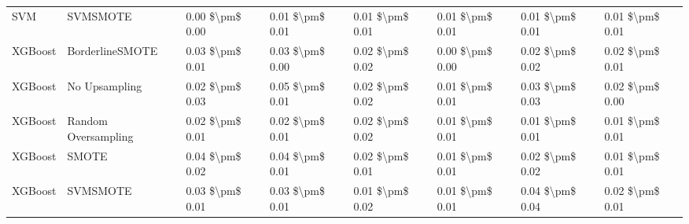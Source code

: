 \begin{tabular}{llllllll}
                            SVM &                      SVMSMOTE & 0.00 \$\textbackslash pm\$ 0.00 &           0.01 \$\textbackslash pm\$ 0.01 &       0.01 \$\textbackslash pm\$ 0.01 &        0.01 \$\textbackslash pm\$ 0.01 &                         0.01 \$\textbackslash pm\$ 0.01 & 0.01 \$\textbackslash pm\$ 0.01 \\
                        XGBoost &               BorderlineSMOTE & 0.03 \$\textbackslash pm\$ 0.01 &           0.03 \$\textbackslash pm\$ 0.00 &       0.02 \$\textbackslash pm\$ 0.02 &        0.00 \$\textbackslash pm\$ 0.00 &                         0.02 \$\textbackslash pm\$ 0.02 & 0.02 \$\textbackslash pm\$ 0.01 \\
                        XGBoost &                 No Upsampling & 0.02 \$\textbackslash pm\$ 0.03 &           0.05 \$\textbackslash pm\$ 0.01 &       0.02 \$\textbackslash pm\$ 0.02 &        0.01 \$\textbackslash pm\$ 0.01 &                         0.03 \$\textbackslash pm\$ 0.03 & 0.02 \$\textbackslash pm\$ 0.00 \\
                        XGBoost &           Random Oversampling & 0.02 \$\textbackslash pm\$ 0.01 &           0.02 \$\textbackslash pm\$ 0.01 &       0.02 \$\textbackslash pm\$ 0.02 &        0.01 \$\textbackslash pm\$ 0.01 &                         0.01 \$\textbackslash pm\$ 0.01 & 0.01 \$\textbackslash pm\$ 0.01 \\
                        XGBoost &                         SMOTE & 0.04 \$\textbackslash pm\$ 0.02 &           0.04 \$\textbackslash pm\$ 0.01 &       0.02 \$\textbackslash pm\$ 0.01 &        0.01 \$\textbackslash pm\$ 0.01 &                         0.02 \$\textbackslash pm\$ 0.02 & 0.01 \$\textbackslash pm\$ 0.01 \\
                        XGBoost &                      SVMSMOTE & 0.03 \$\textbackslash pm\$ 0.01 &           0.03 \$\textbackslash pm\$ 0.01 &       0.01 \$\textbackslash pm\$ 0.02 &        0.01 \$\textbackslash pm\$ 0.01 &                         0.04 \$\textbackslash pm\$ 0.04 & 0.02 \$\textbackslash pm\$ 0.01 \\
\bottomrule
\end{tabular}
